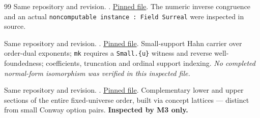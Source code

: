 \documentclass[11pt,letterpaper]{article}
\numberwithin{equation}{section}
\theoremstyle{definition}
\theoremstyle{remark}
\begin{document}
\begin{thebibliography}{99}
Same repository and revision. .
\href{https://github.com/vihdzp/combinatorial-games/blob/02b4a908ea2ecfefffecb438f691951a814a5264/CombinatorialGames/Surreal/Division.lean}{Pinned file}.
The numeric inverse congruence and an actual
\texttt{noncomputable instance : Field Surreal} were inspected in source.

Same repository and revision.
.
\href{https://github.com/vihdzp/combinatorial-games/blob/02b4a908ea2ecfefffecb438f691951a814a5264/CombinatorialGames/Surreal/HahnSeries/Basic.lean}{Pinned file}.
Small-support Hahn carrier over order-dual exponents; \texttt{mk} requires a
\texttt{Small.\{u\}} witness and reverse well-foundedness; coefficients,
truncation and ordinal support indexing. \emph{No completed normal-form
isomorphism was verified in this inspected file.}

Same repository and revision. .
\href{https://github.com/vihdzp/combinatorial-games/blob/02b4a908ea2ecfefffecb438f691951a814a5264/CombinatorialGames/Surreal/Cut.lean}{Pinned file}.
Complementary lower and upper sections of the entire fixed-universe order, built
via concept lattices --- distinct from small Conway option pairs.
\textbf{Inspected by M3 only.}

\end{thebibliography}
\endgroup
\end{document}
